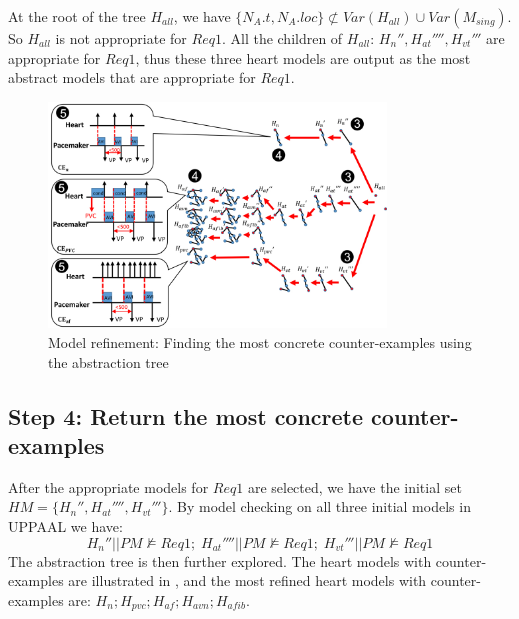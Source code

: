 At the root of the tree $H_{all}$, we have $\{N_A.t,N_A.loc\} \not \subset Var(H_{all})\cup Var(M_{sing})$. 
So $H_{all}$ is not appropriate for $Req1$. 
All the children of $H_{all}$: $H_n'',H_{at}'''',H_{vt}'''$ are appropriate for $Req1$,
thus these three heart models are output as the most abstract models that are appropriate for $Req1$.
\begin{figure}[!t]
	\centering
	\includegraphics[width=0.8\textwidth]{figs/abs_rev.pdf}
	\caption{\small Model refinement: Finding the most concrete counter-examples using the abstraction tree}
	\vspace{-10pt}
	\label{fig:CE}
\end{figure}
	\vspace{-10pt}
\subsection*{Step 4: Return the most concrete counter-examples}
After the appropriate models for $Req1$ are selected, we have the initial set
$HM=\{H_n'',H_{at}'''',H_{vt}'''\}$.
By model checking on all three initial models in UPPAAL we have: 
$$H_n''||PM\not\models Req1;\; H_{at}''''||PM\not\models Req1;\; H_{vt}'''||PM\not\models Req1$$
The abstraction tree is then further explored. The heart models with counter-examples are illustrated in , and the most refined heart models with counter-examples are: $H_{n};H_{pvc};H_{af};H_{avn};H_{afib}$.

